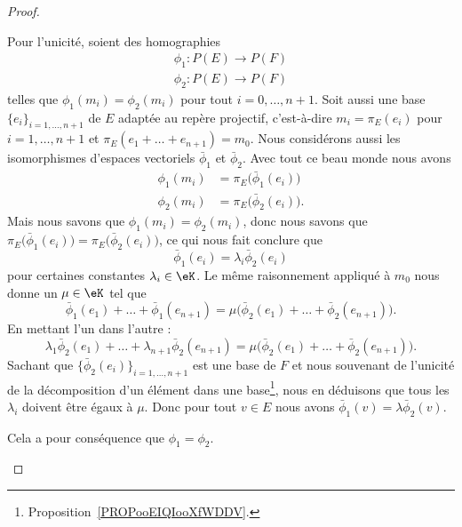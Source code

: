 \begin{proof}
\begin{subproof}
		Pour l'unicité, soient des homographies
		\begin{subequations}
			\begin{align}
				\phi_1\colon P(E)\to P(F) \\
				\phi_2\colon P(E)\to P(F)
			\end{align}
		\end{subequations}
		telles que \( \phi_1(m_i)=\phi_2(m_i)\) pour tout \( i=0,\ldots, n+1\). Soit aussi une base \( \{ e_i \}_{i=1,\ldots, n+1}\) de \( E\) adaptée au repère projectif, c'est-à-dire \( m_i=\pi_E(e_i)\) pour \( i=1,\ldots, n+1\) et \( \pi_E(e_1+\ldots +e_{n+1})=m_0\). Nous considérons aussi les isomorphismes d'espaces vectoriels \( \bar\phi_1\) et \( \bar\phi_2\). Avec tout ce beau monde nous avons
		\begin{subequations}
			\begin{align}
				\phi_1(m_i) & =\pi_E\big( \bar\phi_1(e_i) \big)  \\
				\phi_2(m_i) & =\pi_E\big( \bar\phi_2(e_i) \big).
			\end{align}
		\end{subequations}
		Mais nous savons que \( \phi_1(m_i)=\phi_2(m_i)\), donc nous savons que \( \pi_E\big( \bar\phi_1(e_i) \big)=\pi_E\big( \bar\phi_2(e_i) \big)\), ce qui nous fait conclure que
		\begin{equation}
			\bar\phi_1(e_i)=\lambda_i\bar\phi_2(e_i)
		\end{equation}
		pour certaines constantes \( \lambda_i\in \eK\). Le même raisonnement appliqué à \( m_0\) nous donne un \( \mu\in \eK\) tel que
		\begin{equation}
			\bar\phi_1(e_1)+\ldots +\bar\phi_1(e_{n+1})=\mu\big( \bar\phi_2(e_1)+\ldots +\bar\phi_2(e_{n+1}) \big).
		\end{equation}
		En mettant l'un dans l'autre :
		\begin{equation}
			\lambda_1\bar\phi_2(e_1)+\ldots +\lambda_{n+1}\bar\phi_2(e_{n+1})=\mu\big( \bar\phi_2(e_1)+\ldots +\bar\phi_2(e_{n+1}) \big).
		\end{equation}
		Sachant que \( \{ \bar\phi_2(e_i) \}_{i=1,\ldots, n+1}\) est une base de \( F\) et nous souvenant de l'unicité de la décomposition d'un élément dans une base\footnote{Proposition~\ref{PROPooEIQIooXfWDDV}.}, nous en déduisons que tous les \( \lambda_i\) doivent être égaux à \( \mu\). Donc pour tout \( v\in E\) nous avons \( \bar\phi_1(v)=\lambda\bar\phi_2(v)\).

		Cela a pour conséquence que \( \phi_1=\phi_2\).
	\end{subproof}
\end{proof}

